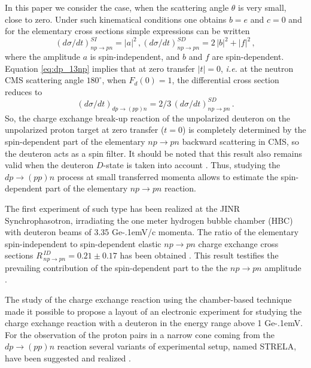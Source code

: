 \documentclass[twocolumn,epjc3]{svjour3}
\newcommand{\np}     {\ensuremath{np \rightarrow pn}\xspace}
\newcommand{\dpchex} {\ensuremath{dp \rightarrow (pp)n}\xspace}
\newcommand{\GeVc}   {Ge\kern-.1emV/c\xspace}
\newcommand{\GeV}    {Ge\kern-.1emV\xspace}
\begin{document}
In this paper we consider the case, when the scattering angle $\theta$ is very
small, close to zero. Under such kinematical conditions one obtains $b = e$ and
$c = 0$ and for the elementary cross sections simple expressions can be written
\begin{equation}
  (d\sigma/dt)^{SI}_{\np} = |a|^2\,,
  (d\sigma/dt)^{SD}_{\np} = 2\,|b|^2 + |f|^2\,,
\end{equation}
where the amplitude $a$ is spin-independent, and $b$ and $f$ are spin-dependent.
Equation \eqref{eq:dp_13np} implies that at zero transfer $|t| = 0$,
\textit{i.e.} at the neutron CMS scattering angle $180^\circ$, when
$F_d(0) = 1$, the differential cross section reduces to
\begin{equation}
  \label{eq:dp_23np}
  (d\sigma/dt)_{\dpchex} = 2/3\,(d\sigma/dt)^{SD}_{\np}\,.
\end{equation}
So, the charge exchange break-up reaction of the unpolarized deuteron on the
unpolarized proton target at zero transfer ($t = 0$) is completely determined by
the spin-dependent part of the elementary \np backward scattering in CMS, so the
deuteron acts as a spin filter. It should be noted that this result also remains
valid when the deuteron $D$-state is taken into account \cite{led04}. Thus,
studying the \dpchex process at small transferred momenta allows to estimate the
spin-dependent part of the elementary \np reaction.

The first experiment of such type has been realized at the JINR
Synchrophasotron, irradiating the one meter hydrogen bubble chamber (HBC) with
deuteron beams of 3.35 \GeVc momenta. The ratio of the elementary
spin-independent to spin-dependent elastic \np charge exchange cross sections
$R^{\,ID}_{\,\np} = 0.21 \pm 0.17$ has been obtained \cite{gla08}. This result
testifies the prevailing contribution of the spin-dependent part to the the \np
amplitude \cite{gla02,gla08}.

The study of the charge exchange reaction using the chamber-based technique made
it possible to propose a layout of an electronic experiment for studying the
charge exchange reaction with a deuteron in the energy range above 1 \GeV. For
the observation of the proton pairs in a narrow cone coming from the \dpchex
reaction several variants of experimental setup, named STRELA, have been
suggested and realized \cite{gla13}.
\end{document}
